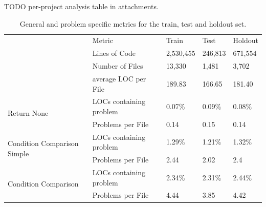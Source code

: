 TODO per-project analysis table in attachments.

\begin{table}[]
    \tabcolsep=0.11cm
    \begin{tabularx}{\textwidth}{@{}llXXX@{}}
        \toprule
    \multirow{4}{*}{}                            & Metric                  & Train & Test & Holdout \\ \cmidrule(l){2-5} 
                                                 & Lines of Code           & 2,530,455 & 246,813 & 671,554 \\
                                                 & Number of Files         & 13,330  &  1,481 & 3,702   \\
                                                 & average LOC per File    & 189.83  & 166.65  & 181.40     \\ \midrule
    \multirow{2}{*}{Return None}                 & LOCs containing problem & 0.07\%  &  0.09\% & 0.08\%  \\
                                                 & Problems per File       & 0.14    & 0.15  & 0.14    \\ \midrule
    \multirow{2}{*}{Condition Comparison Simple} & LOCs containing problem & 1.29\%  &  1.21\%  & 1.32\%  \\
                                                 & Problems per File       & 2.44    & 2.02 & 2.4    \\ \midrule
    \multirow{2}{*}{Condition Comparison}        & LOCs containing problem & 2.34\%  & 2.31\%  & 2.44\%  \\
                                                 & Problems per File       & 4.44    & 3.85  & 4.42    \\ \bottomrule
    \end{tabularx}
    \caption{General and problem specific metrics for the train, test and holdout set.}
    \label{tab:general_data_distribution}
\end{table}

